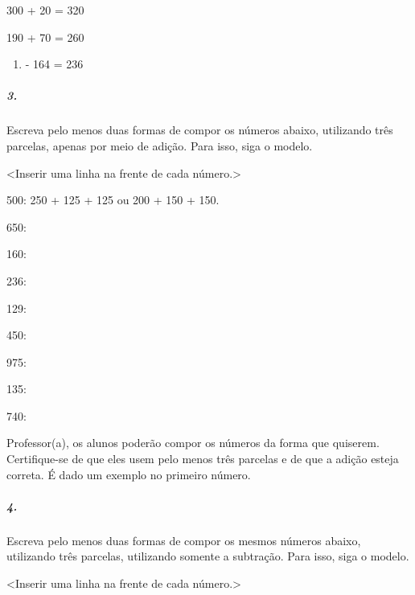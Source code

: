 300 + 20 = 320

190 + 70 = 260



\begin{enumerate}
\def\labelenumi{\arabic{enumi}.}
\setcounter{enumi}{399}
\item
  - 164 = 236
\end{enumerate}

\subparagraph{3.}\label{section-16}

Escreva pelo menos duas formas de compor os números abaixo, utilizando
três parcelas, apenas por meio de adição. Para isso, siga o modelo.

\textless{}Inserir uma linha na frente de cada número.\textgreater{}

500: 250 + 125 + 125 ou 200 + 150 + 150.

650:

160:

236:

129:

450:

975:

135:

740:

Professor(a), os alunos poderão compor os números da forma que quiserem.
Certifique-se de que eles usem pelo menos três parcelas e de que a adição
esteja correta. É dado um exemplo no primeiro número.

\subparagraph{4.}\label{section-17}

Escreva pelo menos duas formas de compor os mesmos números abaixo,
utilizando três parcelas, utilizando somente a subtração. Para isso, siga o modelo.

\textless{}Inserir uma linha na frente de cada número.\textgreater{}


